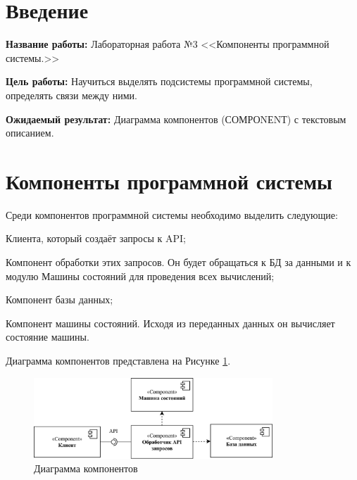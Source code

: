 \documentclass{hse_document}
\begin{document}

\tableofcontents
\clearpage

\section*{Введение} \label{Введение}

\textbf{Название работы:}
Лабораторная работа №3 <<Компоненты программной системы.>>

\textbf{Цель работы:}
Научиться выделять подсистемы программной системы,
определять связи между ними.

\textbf{Ожидаемый результат:}
Диаграмма компонентов (СОМРОNЕNТ) с текстовым описанием.

\section{Компоненты программной системы}\label{sec:components}

Среди компонентов программной системы необходимо выделить следующие:

\begin{compactenum}
\item Клиента, который создаёт запросы к API;
\item Компонент обработки этих запросов. Он будет обращаться к БД за данными и к
    модулю Машины состояний для проведения всех вычислений;
\item Компонент базы данных;
\item Компонент машины состояний. Исходя из переданных данных он вычисляет
    состояние машины.
\end{compactenum}

Диаграмма компонентов представлена на Рисунке \ref{fig:components}.

\begin{figure}[htpb]
    \centering
    \includegraphics[width=0.8\textwidth]{diagrams/components.png}
    \caption{Диаграмма компонентов}
    \label{fig:components}
\end{figure}
\end{document}
